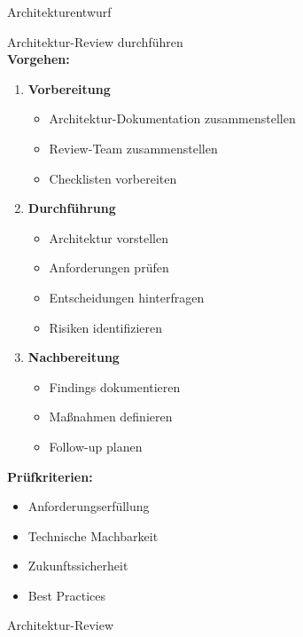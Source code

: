 \begin{example2}{Architekturentwurf}\\
\end{example2}

\begin{KR}{Architektur-Review durchführen}\\
\textbf{Vorgehen:}
\begin{enumerate}
    \item \textbf{Vorbereitung}
    \begin{itemize}
        \item Architektur-Dokumentation zusammenstellen
        \item Review-Team zusammenstellen
        \item Checklisten vorbereiten
    \end{itemize}
    
    \item \textbf{Durchführung}
    \begin{itemize}
        \item Architektur vorstellen
        \item Anforderungen prüfen
        \item Entscheidungen hinterfragen
        \item Risiken identifizieren
    \end{itemize}
    
    \item \textbf{Nachbereitung}
    \begin{itemize}
        \item Findings dokumentieren
        \item Maßnahmen definieren
        \item Follow-up planen
    \end{itemize}
\end{enumerate}

\textbf{Prüfkriterien:}
\begin{itemize}
    \item Anforderungserfüllung
    \item Technische Machbarkeit
    \item Zukunftssicherheit
    \item Best Practices
\end{itemize}
\end{KR}

\begin{example2}{Architektur-Review}\\
\end{example2}



